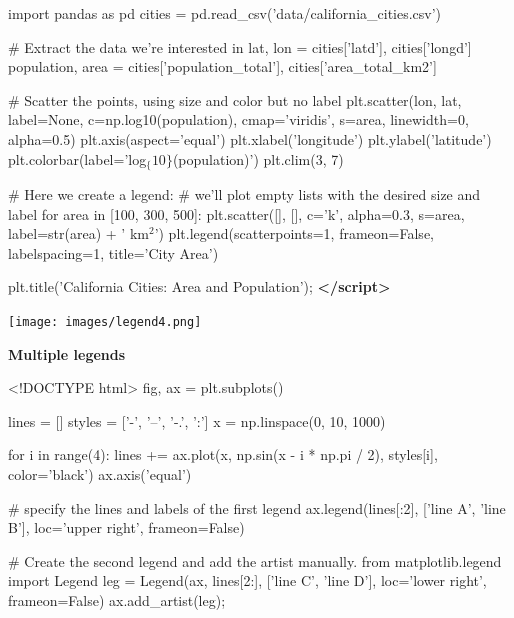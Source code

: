 \documentclass[]{book}
\newenvironment{Shaded}{\begin{snugshade}}{\end{snugshade}}
\newcommand{\DataTypeTok}[1]{\textcolor[rgb]{0.13,0.29,0.53}{#1}}
\newcommand{\KeywordTok}[1]{\textcolor[rgb]{0.13,0.29,0.53}{\textbf{#1}}}
\newcommand{\NormalTok}[1]{#1}
\begin{document}
\begin{Shaded}
\begin{Highlighting}[]
\NormalTok{import pandas as pd}
\NormalTok{cities = pd.read_csv('data/california_cities.csv')}

\NormalTok{# Extract the data we're interested in}
\NormalTok{lat, lon = cities['latd'], cities['longd']}
\NormalTok{population, area = cities['population_total'], cities['area_total_km2']}

\NormalTok{# Scatter the points, using size and color but no label}
\NormalTok{plt.scatter(lon, lat, label=None,}
\NormalTok{            c=np.log10(population), cmap='viridis',}
\NormalTok{            s=area, linewidth=0, alpha=0.5)}
\NormalTok{plt.axis(aspect='equal')}
\NormalTok{plt.xlabel('longitude')}
\NormalTok{plt.ylabel('latitude')}
\NormalTok{plt.colorbar(label='log$_\{10\}$(population)')}
\NormalTok{plt.clim(3, 7)}

\NormalTok{# Here we create a legend:}
\NormalTok{# we'll plot empty lists with the desired size and label}
\NormalTok{for area in [100, 300, 500]:}
\NormalTok{    plt.scatter([], [], c='k', alpha=0.3, s=area,}
\NormalTok{                label=str(area) + ' km$^2$')}
\NormalTok{plt.legend(scatterpoints=1, frameon=False, labelspacing=1, title='City Area')}

\NormalTok{plt.title('California Cities: Area and Population');}
\KeywordTok{</script>}
\end{Highlighting}
\end{Shaded}

\texttt{[image: images/legend4.png]}

\textbf{Multiple legends}

\begin{Shaded}
\begin{Highlighting}[]
\DataTypeTok{<!DOCTYPE }\NormalTok{html}\DataTypeTok{>}
\NormalTok{fig, ax = plt.subplots()}

\NormalTok{lines = []}
\NormalTok{styles = ['-', '--', '-.', ':']}
\NormalTok{x = np.linspace(0, 10, 1000)}

\NormalTok{for i in range(4):}
\NormalTok{    lines += ax.plot(x, np.sin(x - i * np.pi / 2),}
\NormalTok{                     styles[i], color='black')}
\NormalTok{ax.axis('equal')}

\NormalTok{# specify the lines and labels of the first legend}
\NormalTok{ax.legend(lines[:2], ['line A', 'line B'],}
\NormalTok{          loc='upper right', frameon=False)}

\NormalTok{# Create the second legend and add the artist manually.}
\NormalTok{from matplotlib.legend import Legend}
\NormalTok{leg = Legend(ax, lines[2:], ['line C', 'line D'],}
\NormalTok{             loc='lower right', frameon=False)}
\NormalTok{ax.add_artist(leg);}
\end{Highlighting}
\end{Shaded}
\end{document}
